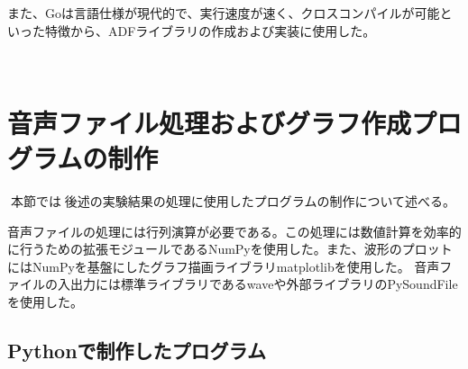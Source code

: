 また、Goは言語仕様が現代的で、実行速度が速く、クロスコンパイルが可能といった特徴から、ADFライブラリの作成および実装に使用した。



\
\section{音声ファイル処理およびグラフ作成プログラムの制作}\label{create-program}

本節では後述の実験結果の処理に使用したプログラムの制作について述べる。

音声ファイルの処理には行列演算が必要である。この処理には数値計算を効率的に行うための拡張モジュールであるNumPyを使用した。また、波形のプロットにはNumPyを基盤にしたグラフ描画ライブラリmatplotlibを使用した。
音声ファイルの入出力には標準ライブラリであるwaveや外部ライブラリのPySoundFileを使用した。


\subsection{Pythonで制作したプログラム}\label{python}

